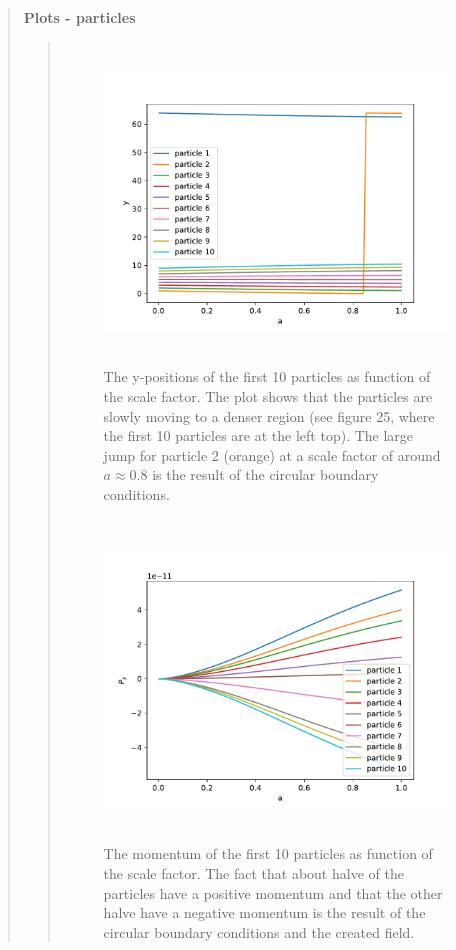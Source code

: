 \begin{quote}
\textbf{Plots - particles}
\begin{quote}
\begin{figure}[!ht]
\centering
\includegraphics[width=14cm, height=8.5cm]{./Plots/4c_pos.pdf}
\caption{The y-positions of the first 10 particles as function of the scale factor. The plot shows that the particles are slowly moving to a denser region (see figure 25, where the first 10 particles are at the left top). The large jump for particle 2 (orange) at a scale factor of around $ a \approx 0.8$ is the result of the circular boundary conditions.  }
\end{figure}

\begin{figure}[!ht]
\centering
\includegraphics[width=14cm, height=8.5cm]{./Plots/4c_momentum.pdf}
\caption{The momentum of the first 10 particles as function of the scale factor. The fact that about halve of the particles have a positive momentum and that the other halve have a negative momentum is the result of the circular boundary conditions and the created field.  }
\end{figure}
\end{quote}
\end{quote}




